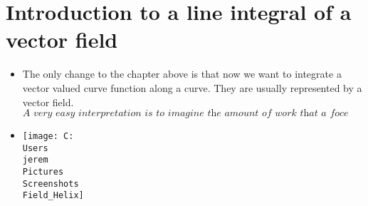 \documentclass[12pt,a4paper]{article}
\begin{document}
	\section{Introduction to a line integral of a vector field}
	
	\begin{itemize}
	\item The only change to the chapter above is that now we want to integrate a vector valued curve function along a curve. They are usually represented by a vector field. \\ $\textit{A very easy interpretation is to imagine the amount of work that a foce field does on a particle as it moves along a curve.}$
	
	\item 
	
	\texttt{[image: C:\\Users\\jerem\\Pictures\\Screenshots\\Field\_Helix]}
	\end{itemize}
	
	
\end{document}
